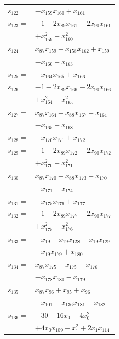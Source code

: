 \begin{longtable}{@{}r@{\;}l@{}}
\(s_{122}=\) & \(\displaystyle -x_{159}x_{160} +x_{161}\) \\[3pt]
\(s_{123}=\) & \(\displaystyle -1 -2x_{89}x_{161} -2x_{90}x_{161}\) \\
 & \(\displaystyle +x_{159}^{2} +x_{160}^{2}\) \\[3pt]
\(s_{124}=\) & \(\displaystyle x_{87}x_{159} -x_{158}x_{162} +x_{159}\) \\
 & \(\displaystyle -x_{160} -x_{163}\) \\[3pt]
\(s_{125}=\) & \(\displaystyle -x_{164}x_{165} +x_{166}\) \\[3pt]
\(s_{126}=\) & \(\displaystyle -1 -2x_{89}x_{166} -2x_{90}x_{166}\) \\
 & \(\displaystyle +x_{164}^{2} +x_{165}^{2}\) \\[3pt]
\(s_{127}=\) & \(\displaystyle x_{87}x_{164} -x_{88}x_{167} +x_{164}\) \\
 & \(\displaystyle -x_{165} -x_{168}\) \\[3pt]
\(s_{128}=\) & \(\displaystyle -x_{170}x_{171} +x_{172}\) \\[3pt]
\(s_{129}=\) & \(\displaystyle -1 -2x_{89}x_{172} -2x_{90}x_{172}\) \\
 & \(\displaystyle +x_{170}^{2} +x_{171}^{2}\) \\[3pt]
\(s_{130}=\) & \(\displaystyle x_{87}x_{170} -x_{88}x_{173} +x_{170}\) \\
 & \(\displaystyle -x_{171} -x_{174}\) \\[3pt]
\(s_{131}=\) & \(\displaystyle -x_{175}x_{176} +x_{177}\) \\[3pt]
\(s_{132}=\) & \(\displaystyle -1 -2x_{89}x_{177} -2x_{90}x_{177}\) \\
 & \(\displaystyle +x_{175}^{2} +x_{176}^{2}\) \\[3pt]
\(s_{133}=\) & \(\displaystyle -x_{19} -x_{19}x_{128} -x_{19}x_{129}\) \\
 & \(\displaystyle -x_{19}x_{179} +x_{180}\) \\[3pt]
\(s_{134}=\) & \(\displaystyle x_{87}x_{175} +x_{175} -x_{176}\) \\
 & \(\displaystyle -x_{178}x_{180} -x_{179}\) \\[3pt]
\(s_{135}=\) & \(\displaystyle x_{87}x_{96} +x_{95} +x_{96}\) \\
 & \(\displaystyle -x_{101} -x_{136}x_{181} -x_{182}\) \\[3pt]
\(s_{136}=\) & \(\displaystyle -30 -16x_{0} -4x_{0}^{2}\) \\
 & \(\displaystyle +4x_{0}x_{109} -x_{1}^{2} +2x_{1}x_{114}\) \\

\end{longtable}
